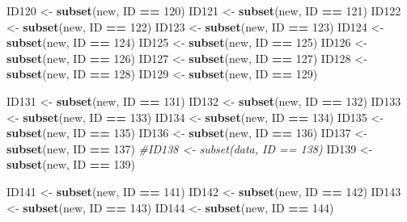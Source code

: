 \documentclass[
]{book}
\newenvironment{Shaded}{\begin{snugshade}}{\end{snugshade}}
\newcommand{\CommentTok}[1]{\textcolor[rgb]{0.56,0.35,0.01}{\textit{#1}}}
\newcommand{\DecValTok}[1]{\textcolor[rgb]{0.00,0.00,0.81}{#1}}
\newcommand{\KeywordTok}[1]{\textcolor[rgb]{0.13,0.29,0.53}{\textbf{#1}}}
\newcommand{\NormalTok}[1]{#1}
\newcommand{\OperatorTok}[1]{\textcolor[rgb]{0.81,0.36,0.00}{\textbf{#1}}}
\newcommand{\StringTok}[1]{\textcolor[rgb]{0.31,0.60,0.02}{#1}}
\begin{document}
\begin{Shaded}
\begin{Highlighting}[]
{{{{{{\NormalTok{ID120 <-}\StringTok{ }\KeywordTok{subset}\NormalTok{(new, ID }\OperatorTok{==}\StringTok{ }\DecValTok{120}\NormalTok{)}
\NormalTok{ID121 <-}\StringTok{ }\KeywordTok{subset}\NormalTok{(new, ID }\OperatorTok{==}\StringTok{ }\DecValTok{121}\NormalTok{)}
\NormalTok{ID122 <-}\StringTok{ }\KeywordTok{subset}\NormalTok{(new, ID }\OperatorTok{==}\StringTok{ }\DecValTok{122}\NormalTok{)}
\NormalTok{ID123 <-}\StringTok{ }\KeywordTok{subset}\NormalTok{(new, ID }\OperatorTok{==}\StringTok{ }\DecValTok{123}\NormalTok{)}
\NormalTok{ID124 <-}\StringTok{ }\KeywordTok{subset}\NormalTok{(new, ID }\OperatorTok{==}\StringTok{ }\DecValTok{124}\NormalTok{)}
\NormalTok{ID125 <-}\StringTok{ }\KeywordTok{subset}\NormalTok{(new, ID }\OperatorTok{==}\StringTok{ }\DecValTok{125}\NormalTok{)}
\NormalTok{ID126 <-}\StringTok{ }\KeywordTok{subset}\NormalTok{(new, ID }\OperatorTok{==}\StringTok{ }\DecValTok{126}\NormalTok{)}
\NormalTok{ID127 <-}\StringTok{ }\KeywordTok{subset}\NormalTok{(new, ID }\OperatorTok{==}\StringTok{ }\DecValTok{127}\NormalTok{)}
\NormalTok{ID128 <-}\StringTok{ }\KeywordTok{subset}\NormalTok{(new, ID }\OperatorTok{==}\StringTok{ }\DecValTok{128}\NormalTok{)}
\NormalTok{ID129 <-}\StringTok{ }\KeywordTok{subset}\NormalTok{(new, ID }\OperatorTok{==}\StringTok{ }\DecValTok{129}\NormalTok{)}

\NormalTok{ID131 <-}\StringTok{ }\KeywordTok{subset}\NormalTok{(new, ID }\OperatorTok{==}\StringTok{ }\DecValTok{131}\NormalTok{) }
\NormalTok{ID132 <-}\StringTok{ }\KeywordTok{subset}\NormalTok{(new, ID }\OperatorTok{==}\StringTok{ }\DecValTok{132}\NormalTok{)}
\NormalTok{ID133 <-}\StringTok{ }\KeywordTok{subset}\NormalTok{(new, ID }\OperatorTok{==}\StringTok{ }\DecValTok{133}\NormalTok{)}
\NormalTok{ID134 <-}\StringTok{ }\KeywordTok{subset}\NormalTok{(new, ID }\OperatorTok{==}\StringTok{ }\DecValTok{134}\NormalTok{)}
\NormalTok{ID135 <-}\StringTok{ }\KeywordTok{subset}\NormalTok{(new, ID }\OperatorTok{==}\StringTok{ }\DecValTok{135}\NormalTok{)}
\NormalTok{ID136 <-}\StringTok{ }\KeywordTok{subset}\NormalTok{(new, ID }\OperatorTok{==}\StringTok{ }\DecValTok{136}\NormalTok{)}
\NormalTok{ID137 <-}\StringTok{ }\KeywordTok{subset}\NormalTok{(new, ID }\OperatorTok{==}\StringTok{ }\DecValTok{137}\NormalTok{)}
\CommentTok{#ID138 <- subset(data, ID == 138)}
\NormalTok{ID139 <-}\StringTok{ }\KeywordTok{subset}\NormalTok{(new, ID }\OperatorTok{==}\StringTok{ }\DecValTok{139}\NormalTok{)}

\NormalTok{ID141 <-}\StringTok{ }\KeywordTok{subset}\NormalTok{(new, ID }\OperatorTok{==}\StringTok{ }\DecValTok{141}\NormalTok{)}
\NormalTok{ID142 <-}\StringTok{ }\KeywordTok{subset}\NormalTok{(new, ID }\OperatorTok{==}\StringTok{ }\DecValTok{142}\NormalTok{)}
\NormalTok{ID143 <-}\StringTok{ }\KeywordTok{subset}\NormalTok{(new, ID }\OperatorTok{==}\StringTok{ }\DecValTok{143}\NormalTok{)}
\NormalTok{ID144 <-}\StringTok{ }\KeywordTok{subset}\NormalTok{(new, ID }\OperatorTok{==}\StringTok{ }\DecValTok{144}\NormalTok{)}

}}}}}}
\end{Highlighting}
\end{Shaded}
\end{document}

